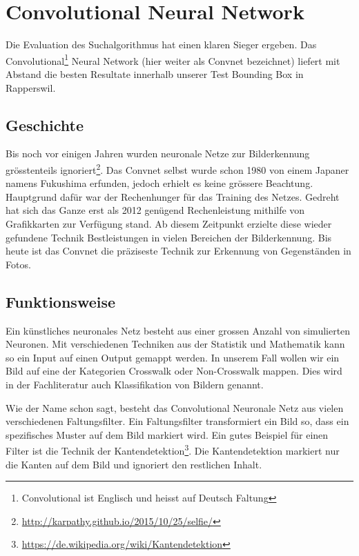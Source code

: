 \section{Convolutional Neural Network}
Die Evaluation des Suchalgorithmus hat einen klaren Sieger ergeben. Das Convolutional\footnote{Convolutional ist Englisch und heisst auf Deutsch Faltung} Neural Network (hier weiter als Convnet bezeichnet) liefert mit Abstand die besten Resultate innerhalb unserer Test Bounding Box in Rapperswil.

\subsection{Geschichte}
Bis noch vor einigen Jahren wurden neuronale Netze zur Bilderkennung grösstenteils ignoriert\footnote{\url{http://karpathy.github.io/2015/10/25/selfie/}}. Das Convnet selbst wurde schon 1980 von einem Japaner namens Fukushima erfunden, jedoch erhielt es keine grössere Beachtung. Hauptgrund dafür war der Rechenhunger für das Training des Netzes. Gedreht hat sich das Ganze erst als 2012 genügend Rechenleistung mithilfe von Grafikkarten zur Verfügung stand. Ab diesem Zeitpunkt erzielte diese wieder gefundene Technik Bestleistungen in vielen Bereichen der Bilderkennung. Bis heute ist das Convnet die präziseste Technik zur Erkennung von Gegenständen in Fotos.

\subsection{Funktionsweise}
Ein künstliches neuronales Netz besteht aus einer grossen Anzahl von simulierten Neuronen. Mit verschiedenen Techniken aus der Statistik und  Mathematik kann so ein Input auf einen Output gemappt werden. In unserem Fall wollen wir ein Bild auf eine der Kategorien Crosswalk oder Non-Crosswalk mappen. Dies wird in der Fachliteratur auch Klassifikation von Bildern genannt.

Wie der Name schon sagt, besteht das Convolutional Neuronale Netz aus vielen verschiedenen Faltungsfilter. Ein Faltungsfilter transformiert ein Bild so, dass ein spezifisches Muster auf dem Bild markiert wird. Ein gutes Beispiel für einen Filter ist die Technik der Kantendetektion\footnote{\url{https://de.wikipedia.org/wiki/Kantendetektion}}. Die Kantendetektion markiert nur die Kanten auf dem Bild und ignoriert den restlichen Inhalt.\\

